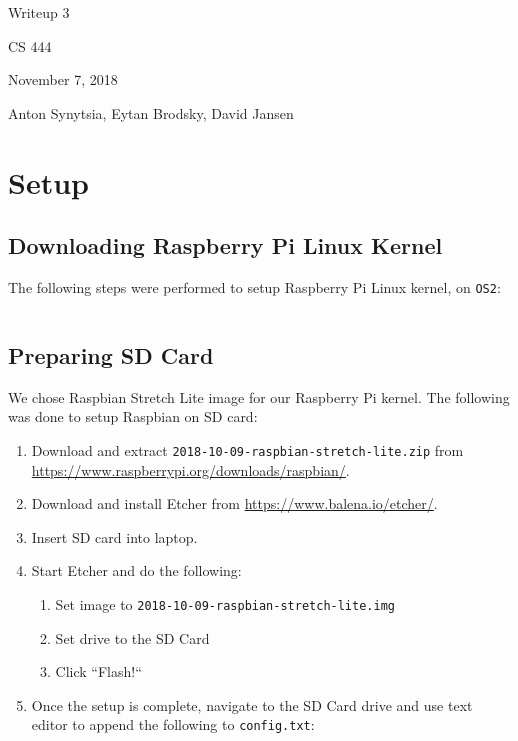 \documentclass[onecolumn, draftclsnofoot, 10pt]{IEEEtran}
\begin{document}
\begin{titlepage}
\begin{singlespace}
\centering
\scshape{
    \huge{Writeup 3}\par
    \vspace{.5in}
    \large{CS 444}\par
    \large{November 7, 2018}\par
    \vspace{.5in}
    \large{Anton Synytsia, Eytan Brodsky, David Jansen}\par
    \vspace{.5in}
    \vfill
}
\end{singlespace}
\end{titlepage}
\newpage
{}
\tableofcontents
\clearpage

\section{Setup}

\subsection{Downloading Raspberry Pi Linux Kernel}
The following steps were performed to setup Raspberry Pi Linux kernel, on \texttt{OS2}:
\inputminted[breaklines]{bash}{cs1.sh}


\subsection{Preparing SD Card}
We chose Raspbian Stretch Lite image for our Raspberry Pi kernel. The following was done to setup Raspbian on SD card:
\begin{enumerate}
\item Download and extract \texttt{2018-10-09-raspbian-stretch-lite.zip} from \url{https://www.raspberrypi.org/downloads/raspbian/}.
\item Download and install Etcher from \url{https://www.balena.io/etcher/}.
\item Insert SD card into laptop.
\item Start Etcher and do the following:
    \begin{enumerate}
    \item Set image to \texttt{2018-10-09-raspbian-stretch-lite.img}
    \item Set drive to the SD Card
    \item Click ``Flash!``
    \end{enumerate}
\item Once the setup is complete, navigate to the SD Card drive and use text editor to append the following to \texttt{config.txt}:
\inputminted[breaklines]{bash}{cs2.sh}
\end{enumerate}
\end{document}
